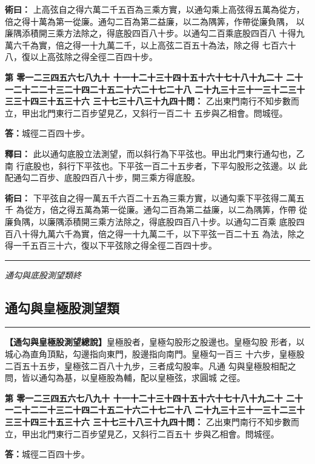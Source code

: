 \documentclass[11pt,a4paper]{article}
\newcommand{\longline}{\noindent\rule{\textwidth}{0.4pt}}
\newcounter{probnum}
\newcommand{\chnum}[1]{%
  \ifcase#1 零\or 一\or 二\or 三\or 四\or 五\or 六\or 七\or 八\or 九\or 十\or
    十一\or 十二\or 十三\or 十四\or 十五\or 十六\or 十七\or 十八\or 十九\or 二十\or
    二十一\or 二十二\or 二十三\or 二十四\or 二十五\or 二十六\or 二十七\or 二十八\or
    二十九\or 三十\or 三十一\or 三十二\or 三十三\or 三十四\or 三十五\or 三十六\or
    三十七\or 三十八\or 三十九\or 四十\fi}
\newcommand{\problem}[1]{\stepcounter{probnum}\par\noindent\textbf{第\chnum{\value{probnum}}問：}#1\par}
\newcommand{\answer}[1]{\par\noindent\textbf{答：}#1\par}
\newcommand{\shiyi}[1]{\par\noindent\textbf{釋曰：}#1\par}
\newcommand{\shuyue}[1]{\par\noindent\textbf{術曰：}#1\par}
\begin{document}
\shuyue{
上高弦自之得六萬二千五百為三乘方實，以通勾乘上高弦得五萬為從方，
倍之得十萬為第一從廉。通勾二百為第二益廉，以二為隅筭，作帶從廉負隅，
以廉隅添積開三乘方法除之，得底股四百八十步。以通勾二百乘底股四百八
十得九萬六千為實，倍之得一十九萬二千，以上高弦二百五十為法，除之得
七百六十八，復以上高弦除之得全徑二百四十步。
}

\vspace{0.3cm}
\problem{
乙出東門南行不知步數而立，甲出北門東行二百步望見乙，又斜行一百二十
五步與乙相會。問城徑。
}

\answer{城徑二百四十步。}

\shiyi{
此以通勾底股立法測望，而以斜行為下平弦也。甲出北門東行通勾也，乙南
行底股也，斜行下平弦也。下平弦一百二十五步者，下平勾股形之弦邊。以
此配通勾二百步、底股四百八十步，開三乘方得底股。
}

\shuyue{
下平弦自之得一萬五千六百二十五為三乘方實，以通勾乘下平弦得二萬五千
為從方，倍之得五萬為第一從廉。通勾二百為第二益廉，以二為隅筭，作帶
從廉負隅，以廉隅添積開三乘方法除之，得底股四百八十步。以通勾二百乘
底股四百八十得九萬六千為實，倍之得一十九萬二千，以下平弦一百二十五
為法，除之得一千五百三十六，復以下平弦除之得全徑二百四十步。
}

\vspace{0.5cm}
\longline
\begin{center}
\textit{通勾與底股測望類終}
\end{center}

\newpage
\setcounter{probnum}{0}

\subsection*{通勾與皇極股測望類}
\vspace{0.3cm}
\longline
\vspace{0.3cm}

\noindent
\textbf{【通勾與皇極股測望總說】}皇極股者，皇極勾股形之股邊也。皇極勾股
形者，以城心為直角頂點，勾邊指向東門，股邊指向南門。皇極勾一百三
十六步，皇極股二百五十五步，皇極弦二百八十九步，三者成勾股率。凡通
勾與皇極股相配之問，皆以通勾為基，以皇極股為輔，配以皇極弦，求圓城
之徑。

\problem{
乙出東門南行不知步數而立，甲出北門東行二百步望見乙，又斜行二百五十
步與乙相會。問城徑。
}

\answer{城徑二百四十步。}
\end{document}
